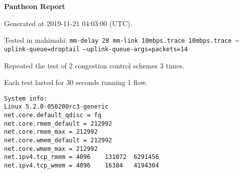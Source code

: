 \documentclass{article}
\begin{document}
\centerline{\textbf{\large{Pantheon Report}}}
\vspace{20pt}

Generated at 2019-11-21 04:03:00 (UTC).

Tested in mahimahi: \texttt{mm-delay 28 mm-link 10mbps.trace 10mbps.trace --uplink-queue=droptail --uplink-queue-args=packets=14}

Repeated the test of 2 congestion control schemes 3 times.

Each test lasted for 30 seconds running 1 flow.

\begin{verbatim}
System info:
Linux 5.2.0-050200rc3-generic
net.core.default_qdisc = fq
net.core.rmem_default = 212992
net.core.rmem_max = 212992
net.core.wmem_default = 212992
net.core.wmem_max = 212992
net.ipv4.tcp_rmem = 4096	131072	6291456
net.ipv4.tcp_wmem = 4096	16384	4194304
\end{verbatim}
\end{document}
